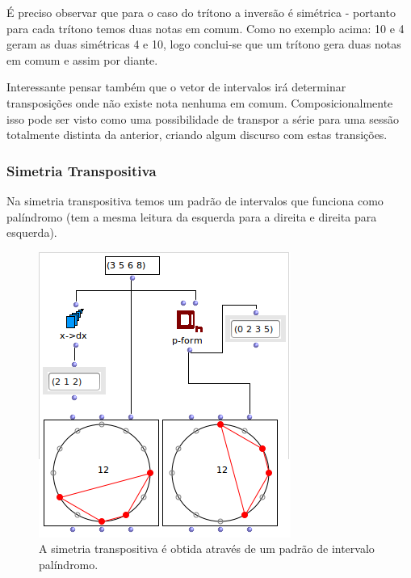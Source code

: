 \documentclass[
	12pt,				%
	openright,			%
	twoside,			%
	a4paper,			%
	english,			%
	french,				%
	spanish,			%
	brazil				%
	]{abntex2}
\begin{document}
É preciso observar que para o caso do trítono a inversão é simétrica - portanto para cada trítono temos duas notas em comum. Como no exemplo acima: 10 e 4 geram as duas simétricas 4 e 10, logo conclui-se que um trítono gera duas notas em comum e assim por diante.

Interessante pensar também que o vetor de intervalos irá determinar transposições onde não existe nota nenhuma em comum. Composicionalmente isso pode ser visto como uma possibilidade de transpor a série para uma sessão totalmente distinta da anterior, criando algum discurso com estas transições.


\subsubsection{Simetria Transpositiva}

Na simetria transpositiva temos um padrão de intervalos que funciona como palíndromo (tem a mesma leitura da esquerda para a direita e direita para esquerda).

\begin{figure}[!h]
	\caption{\label{fig_grafico}A simetria transpositiva é obtida através de um padrão de intervalo palíndromo. }
	\begin{center}
	    \includegraphics[scale=0.6]{OM_settheory/palindrome1.png}
	\end{center}
\end{figure}
\end{document}
